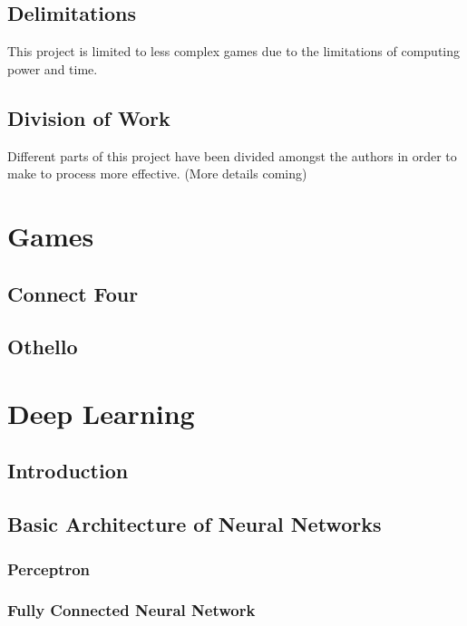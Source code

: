 \documentclass[titlepage]{article}
\begin{document}
\vskip 1cm

\subsection{Delimitations}

This project is limited to less complex games due to the limitations of computing power and time.

\newpage

\subsection{Division of Work}

Different parts of this project have been divided amongst the authors in order to make to process more effective. 
(More details coming) 

\newpage

\section{Games}
\subsection{Connect Four}
\subsection{Othello}

\newpage

\section{Deep Learning}

\subsection{Introduction}

\newpage

\subsection{Basic Architecture of Neural Networks}
\subsubsection{Perceptron}
\subsubsection{Fully Connected Neural Network}
\end{document}
